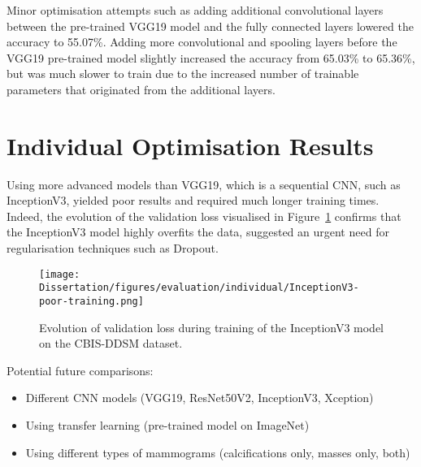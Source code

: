 Minor optimisation attempts such as adding additional convolutional layers between the pre-trained VGG19 model and the fully connected layers lowered the accuracy to 55.07\%. Adding more convolutional and spooling layers before the VGG19 pre-trained model slightly increased the accuracy from 65.03\% to 65.36\%, but was much slower to train due to the increased number of trainable parameters that originated from the additional layers.


\section{Individual Optimisation Results}

Using more advanced models than VGG19, which is a sequential CNN, such as InceptionV3, yielded poor results and required much longer training times. Indeed, the evolution of the validation loss visualised in Figure~\ref{fig:evaluation-individual-inceptionv3-poor-training}  confirms that  the InceptionV3 model highly overfits the data, suggested an urgent need for regularisation techniques such as Dropout.\\

\begin{figure}[ht]
\centerline{\texttt{[image: Dissertation/figures/evaluation/individual/InceptionV3-poor-training.png]}}
\caption{\label{fig:evaluation-individual-inceptionv3-poor-training}Evolution of validation loss during training of the InceptionV3 model on the CBIS-DDSM dataset.}
\end{figure}

Potential future comparisons:
\begin{itemize}
    \item Different CNN models (VGG19, ResNet50V2, InceptionV3, Xception)
    \item Using transfer learning (pre-trained model on ImageNet)
    \item Using different types of mammograms (calcifications only, masses only, both)
\end{itemize}
